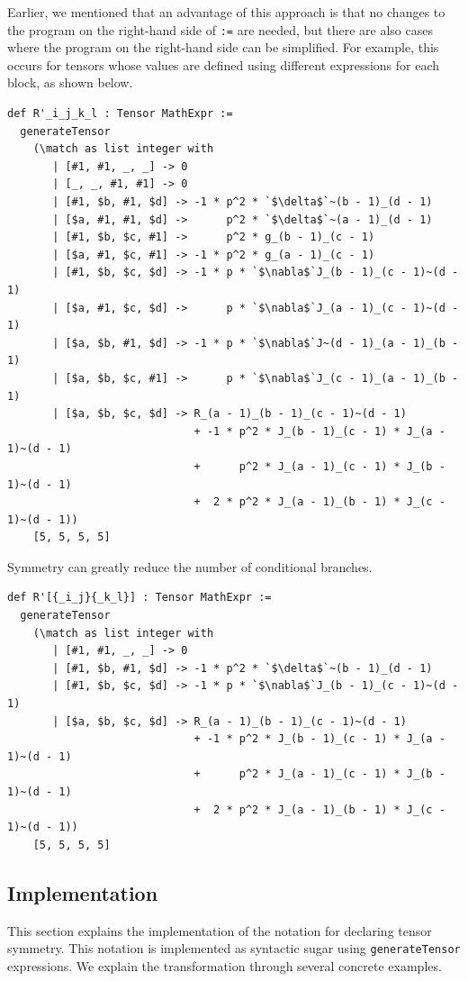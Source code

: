 Earlier, we mentioned that an advantage of this approach is that no changes to the program on the right-hand side of \lstinline{:=} are needed, but there are also cases where the program on the right-hand side can be simplified.
For example, this occurs for tensors whose values are defined using different expressions for each block, as shown below.
\begin{lstlisting}[language=egison,numbers=none]
def R'_i_j_k_l : Tensor MathExpr :=
  generateTensor
    (\match as list integer with
       | [#1, #1, _, _] -> 0
       | [_, _, #1, #1] -> 0
       | [#1, $b, #1, $d] -> -1 * p^2 * `$\delta$`~(b - 1)_(d - 1)
       | [$a, #1, #1, $d] ->      p^2 * `$\delta$`~(a - 1)_(d - 1)
       | [#1, $b, $c, #1] ->      p^2 * g_(b - 1)_(c - 1)
       | [$a, #1, $c, #1] -> -1 * p^2 * g_(a - 1)_(c - 1)
       | [#1, $b, $c, $d] -> -1 * p * `$\nabla$`J_(b - 1)_(c - 1)~(d - 1)
       | [$a, #1, $c, $d] ->      p * `$\nabla$`J_(a - 1)_(c - 1)~(d - 1)
       | [$a, $b, #1, $d] -> -1 * p * `$\nabla$`J~(d - 1)_(a - 1)_(b - 1)
       | [$a, $b, $c, #1] ->      p * `$\nabla$`J_(c - 1)_(a - 1)_(b - 1)
       | [$a, $b, $c, $d] -> R_(a - 1)_(b - 1)_(c - 1)~(d - 1)
                             + -1 * p^2 * J_(b - 1)_(c - 1) * J_(a - 1)~(d - 1)
                             +      p^2 * J_(a - 1)_(c - 1) * J_(b - 1)~(d - 1)
                             +  2 * p^2 * J_(a - 1)_(b - 1) * J_(c - 1)~(d - 1))
    [5, 5, 5, 5]
\end{lstlisting}
Symmetry can greatly reduce the number of conditional branches.
\begin{lstlisting}[language=egison,numbers=none]
def R'[{_i_j}{_k_l}] : Tensor MathExpr :=
  generateTensor
    (\match as list integer with
       | [#1, #1, _, _] -> 0
       | [#1, $b, #1, $d] -> -1 * p^2 * `$\delta$`~(b - 1)_(d - 1)
       | [#1, $b, $c, $d] -> -1 * p * `$\nabla$`J_(b - 1)_(c - 1)~(d - 1)
       | [$a, $b, $c, $d] -> R_(a - 1)_(b - 1)_(c - 1)~(d - 1)
                             + -1 * p^2 * J_(b - 1)_(c - 1) * J_(a - 1)~(d - 1)
                             +      p^2 * J_(a - 1)_(c - 1) * J_(b - 1)~(d - 1)
                             +  2 * p^2 * J_(a - 1)_(b - 1) * J_(c - 1)~(d - 1))
    [5, 5, 5, 5]
\end{lstlisting}


\subsection{Implementation}

This section explains the implementation of the notation for declaring tensor symmetry.
This notation is implemented as syntactic sugar using \lstinline{generateTensor} expressions.
We explain the transformation through several concrete examples.

